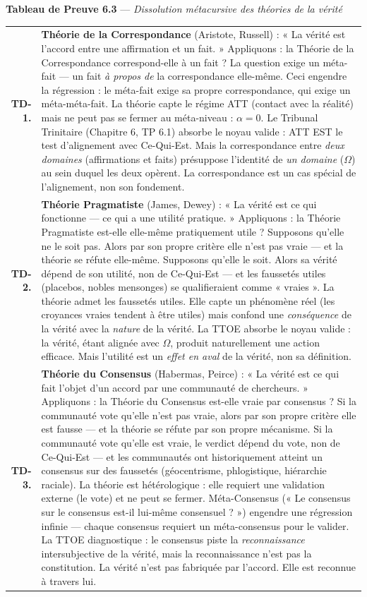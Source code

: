 \documentclass[10pt, openany, oneside]{book}
\renewcommand{\footnotesize}{\fontsize{8.5}{11}\selectfont}
\begin{document}
\textbf{Tableau de Preuve 6.3} --- \textit{Dissolution métacursive des théories de la vérité}

\vspace{0.5em}

{\footnotesize
\noindent\begin{tabular}{r p{}}
\textbf{TD-1.} & \textbf{Théorie de la Correspondance} (Aristote, Russell) : « La vérité est l'accord entre une affirmation et un fait. » Appliquons : la Théorie de la Correspondance correspond-elle à un fait ? La question exige un méta-fait --- un fait \textit{à propos de} la correspondance elle-même. Ceci engendre la régression : le méta-fait exige sa propre correspondance, qui exige un méta-méta-fait. La théorie capte le régime ATT (contact avec la réalité) mais ne peut pas se fermer au méta-niveau : $\alpha = 0$. Le Tribunal Trinitaire (Chapitre 6, TP 6.1) absorbe le noyau valide : ATT EST le test d'alignement avec Ce-Qui-Est. Mais la correspondance entre \textit{deux domaines} (affirmations et faits) présuppose l'identité de \textit{un domaine} ($\Omega$) au sein duquel les deux opèrent. La correspondance est un cas spécial de l'alignement, non son fondement.\\[0.5em]
\textbf{TD-2.} & \textbf{Théorie Pragmatiste} (James, Dewey) : « La vérité est ce qui fonctionne --- ce qui a une utilité pratique. » Appliquons : la Théorie Pragmatiste est-elle elle-même pratiquement utile ? Supposons qu'elle ne le soit pas. Alors par son propre critère elle n'est pas vraie --- et la théorie se réfute elle-même. Supposons qu'elle le soit. Alors sa vérité dépend de son utilité, non de Ce-Qui-Est --- et les faussetés utiles (placebos, nobles mensonges) se qualifieraient comme « vraies ». La théorie admet les faussetés utiles. Elle capte un phénomène réel (les croyances vraies tendent à être utiles) mais confond une \textit{conséquence} de la vérité avec la \textit{nature} de la vérité. La TTOE absorbe le noyau valide : la vérité, étant alignée avec $\Omega$, produit naturellement une action efficace. Mais l'utilité est un \textit{effet en aval} de la vérité, non sa définition.\\[0.5em]
\textbf{TD-3.} & \textbf{Théorie du Consensus} (Habermas, Peirce) : « La vérité est ce qui fait l'objet d'un accord par une communauté de chercheurs. » Appliquons : la Théorie du Consensus est-elle vraie par consensus ? Si la communauté vote qu'elle n'est pas vraie, alors par son propre critère elle est fausse --- et la théorie se réfute par son propre mécanisme. Si la communauté vote qu'elle est vraie, le verdict dépend du vote, non de Ce-Qui-Est --- et les communautés ont historiquement atteint un consensus sur des faussetés (géocentrisme, phlogistique, hiérarchie raciale). La théorie est hétérologique : elle requiert une validation externe (le vote) et ne peut se fermer. Méta-Consensus (« Le consensus sur le consensus est-il lui-même consensuel ? ») engendre une régression infinie --- chaque consensus requiert un méta-consensus pour le valider. La TTOE diagnostique : le consensus piste la \textit{reconnaissance} intersubjective de la vérité, mais la reconnaissance n'est pas la constitution. La vérité n'est pas fabriquée par l'accord. Elle est reconnue à travers lui.\\[0.5em]

\end{tabular}}
\end{document}
